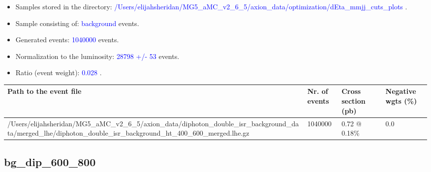 \documentclass[a4paper, 10pt]{article}
\begin{document}
\begin{itemize}
  \item Samples stored in the directory: \textcolor{blue}{/\-Users/\-elijahsheridan/\-MG5\_aMC\_v2\_6\_5/\-axion\_data/\-optimization/\-dEta\_mmjj\_cuts\_plots} .
   \item Sample consisting of: \textcolor{blue}{background}  events.
   \item Generated events: \textcolor{blue}{1040000 }  events.
   \item Normalization to the luminosity: \textcolor{blue}{28798}\textcolor{blue}{ +/\-- }\textcolor{blue}{53 }  events.
   \item Ratio (event weight): \textcolor{blue}{0.028 } .  
 
\end{itemize}
\begin{table}[H]
  \begin{center}
    \begin{tabular}{|m{55.0mm}|m{25.0mm}|m{30.0mm}|m{30.0mm}|}
      \hline
      {\cellcolor{yellow}         Path to the event file}& {\cellcolor{yellow}         Nr. of events}& {\cellcolor{yellow}         Cross section (pb)}& {\cellcolor{yellow}         Negative wgts (\%)}\\
      \hline
      {\cellcolor{white}          /\-Users/\-elijahsheridan/\-MG5\_aMC\_v2\_6\_5/\-axion\_data/\-diphoton\_double\_isr\_background\_data/\-merged\_lhe/\-diphoton\_double\_isr\_background\_ht\_400\_600\_merged.lhe.gz}& {\cellcolor{white}          1040000}& {\cellcolor{white}          0.72 @ 0.18\%}& {\cellcolor{white}          0.0}\\
\hline
    \end{tabular}
  \end{center}
\end{table}

\subsection{ bg\_dip\_600\_800}
\end{document}
